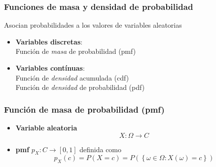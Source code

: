 \documentclass[xcolor=dvipsnames,10pt]{beamer}
\begin{document}
%
\begin{frame}
  \frametitle{Funciones de masa y densidad de probabilidad}
  Asocian probabilidades a los valores de variables aleatorias
  \begin{itemize}
  \item \textbf{Variables discretas}:\\
    Función de \emph{masa} de probabilidad (pmf)
  \item \textbf{Variables contínuas}:\\
    Función de \emph{densidad} acumulada (cdf)\\
    Función de \emph{densidad} de probabilidad (pdf)
  \end{itemize}
\end{frame}
%
\begin{frame}
  \frametitle{Función de masa de probabilidad (pmf)}
  \begin{itemize}
  \item \textbf{Variable aleatoria}
    \begin{equation*}
      X \colon \Omega \to C
    \end{equation*}
  \item \textbf{pmf} $p_X : C \to [0, 1]$ definida como
    \begin{equation*}
      p_X(c) = P(X = c) = P \left ( \left \{ \omega \in \Omega \colon X(\omega) = c \right \} \right )
    \end{equation*}
  \end{itemize}
\end{frame}
%
\end{document}
